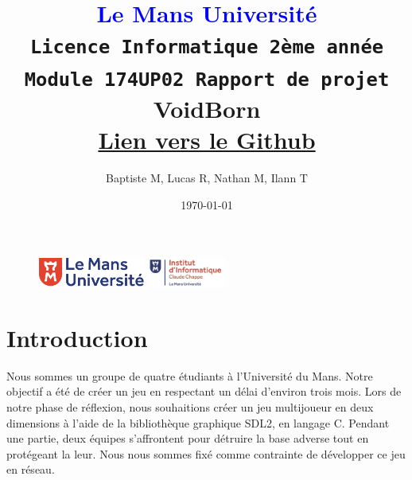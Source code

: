 \documentclass[11pt]{article}
\begin{document}
\begin{figure}
    \includegraphics[height=1cm]{logolemansU.png}
    \hfill
    \includegraphics[height=1cm]{logo_IC2.png}
\end{figure}
    \title { 
        \textcolor{blue}{Le Mans Université} \\
        \texttt{Licence Informatique 2ème année} \\
        \texttt{Module 174UP02 Rapport de projet}\\
        \textbf{VoidBorn}\\
        \href{https://github.com/Herebios/projet}{Lien vers le Github}
    }
    
    \author{Baptiste M, Lucas R, Nathan M, Ilann T} 
    \date{\today} 
    \maketitle

    \newpage
    \tableofcontents
    \newpage
    
    \section{Introduction}
    Nous sommes un groupe de quatre étudiants à l’Université du Mans. Notre objectif a été de créer un jeu en respectant un délai d’environ trois mois.
    Lors de notre phase de réflexion, nous souhaitions créer un jeu multijoueur en deux dimensions à l’aide de la bibliothèque graphique SDL2, en langage C.
    Pendant une partie, deux équipes s’affrontent pour détruire la base adverse tout en protégeant la leur.
    Nous nous sommes fixé comme contrainte de développer ce jeu en réseau.
\end{document}
